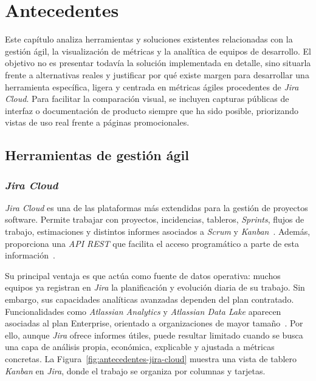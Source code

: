 \chapter{Antecedentes}
\label{antecedentes}

Este capítulo analiza herramientas y soluciones existentes relacionadas con la gestión ágil, la visualización de métricas y la analítica de equipos de desarrollo. El objetivo no es presentar todavía la solución implementada en detalle, sino situarla frente a alternativas reales y justificar por qué existe margen para desarrollar una herramienta específica, ligera y centrada en métricas ágiles procedentes de \textit{Jira Cloud}. Para facilitar la comparación visual, se incluyen capturas públicas de interfaz o documentación de producto siempre que ha sido posible, priorizando vistas de uso real frente a páginas promocionales.

\section{Herramientas de gestión ágil}

\subsection{\textit{Jira Cloud}}

\textit{Jira Cloud} es una de las plataformas más extendidas para la gestión de proyectos software. Permite trabajar con proyectos, incidencias, tableros, \textit{Sprints}, flujos de trabajo, estimaciones y distintos informes asociados a \textit{Scrum} y \textit{Kanban}~\cite{AtlassianJira}. Además, proporciona una \textit{API REST} que facilita el acceso programático a parte de esta información~\cite{AtlassianJiraRestV3}.

Su principal ventaja es que actúa como fuente de datos operativa: muchos equipos ya registran en \textit{Jira} la planificación y evolución diaria de su trabajo. Sin embargo, sus capacidades analíticas avanzadas dependen del plan contratado. Funcionalidades como \textit{Atlassian Analytics} y \textit{Atlassian Data Lake} aparecen asociadas al plan Enterprise, orientado a organizaciones de mayor tamaño~\cite{AtlassianJiraPricing}. Por ello, aunque \textit{Jira} ofrece informes útiles, puede resultar limitado cuando se busca una capa de análisis propia, económica, explicable y ajustada a métricas concretas. La Figura~\ref{fig:antecedentes-jira-cloud} muestra una vista de tablero \textit{Kanban} en \textit{Jira}, donde el trabajo se organiza por columnas y tarjetas.

